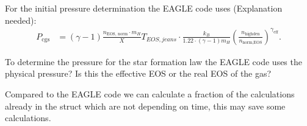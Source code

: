 For the initial pressure determination the EAGLE code uses (Explanation needed):
\begin{align}
 P_\text{cgs} &= (\gamma -1) \frac{n_\text{EOS, norm} \cdot m_H}{X} T_{EOS,jeans} \cdot \frac{k_B}{1.22 \cdot (\gamma -1) m_H } \left( \frac{n_\text{highden}}{n_\text{norm,EOS}} \right)^{\gamma_\text{eff}}.
\end{align}

To determine the pressure for the star formation law the EAGLE code uses the 
physical pressure? Is this the effective EOS or the real EOS of the gas?

Compared to the EAGLE code we can calculate a fraction of the calculations already 
in the struct which are not depending on time, this may save some calculations. 







